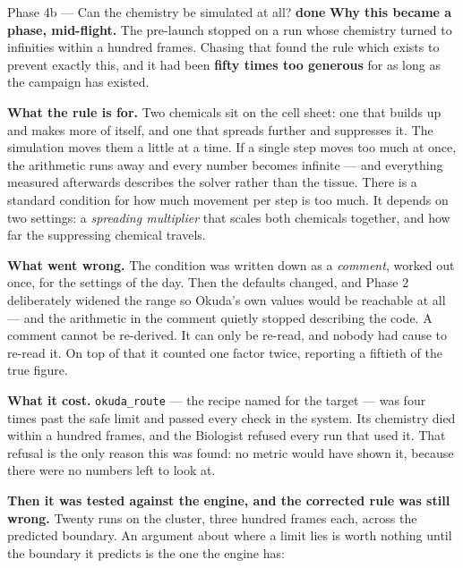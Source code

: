 \documentclass[11pt,a4paper]{article}
\newcommand{\code}[1]{\texttt{#1}}
\newcommand{\dn}{\textcolor{good}{\textbf{done}}}
\begin{document}
\begin{phasebox}{Phase 4b --- Can the chemistry be simulated at all? \hfill \dn}
\textbf{Why this became a phase, mid-flight.} The pre-launch stopped on a run whose chemistry
turned to infinities within a hundred frames. Chasing that found the rule which exists to prevent
exactly this, and it had been \textbf{fifty times too generous} for as long as the campaign has
existed.

\textbf{What the rule is for.} Two chemicals sit on the cell sheet: one that builds up and makes
more of itself, and one that spreads further and suppresses it. The simulation moves them a little
at a time. If a single step moves too much at once, the arithmetic runs away and every number
becomes infinite --- and everything measured afterwards describes the solver rather than the
tissue. There is a standard condition for how much movement per step is too much. It depends on
two settings: a \emph{spreading multiplier} that scales both chemicals together, and how far the
suppressing chemical travels.

\textbf{What went wrong.} The condition was written down as a \emph{comment}, worked out once, for
the settings of the day. Then the defaults changed, and Phase 2 deliberately widened the range so
Okuda's own values would be reachable at all --- and the arithmetic in the comment quietly stopped
describing the code. A comment cannot be re-derived. It can only be re-read, and nobody had cause
to re-read it. On top of that it counted one factor twice, reporting a fiftieth of the true figure.

\textbf{What it cost.} \code{okuda\_route} --- the recipe named for the target --- was four times
past the safe limit and passed every check in the system. Its chemistry died within a hundred
frames, and the Biologist refused every run that used it. That refusal is the only reason this was
found: no metric would have shown it, because there were no numbers left to look at.

\textbf{Then it was tested against the engine, and the corrected rule was still wrong.} Twenty
runs on the cluster, three hundred frames each, across the predicted boundary. An argument about
where a limit lies is worth nothing until the boundary it predicts is the one the engine has:


\end{phasebox}
\end{document}
